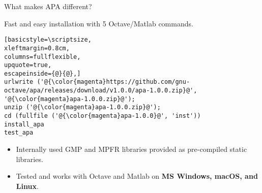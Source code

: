 \begin{frame}[fragile]{What makes APA different?}

\begin{block}{Fast and easy installation with 5 Octave/Matlab commands.}
\begin{lstlisting}[basicstyle=\scriptsize,
xleftmargin=0.8cm,
columns=fullflexible,
upquote=true,
escapeinside={@}{@},]
urlwrite ('@{\color{magenta}https://github.com/gnu-octave/apa/releases/download/v1.0.0/apa-1.0.0.zip}@', '@{\color{magenta}apa-1.0.0.zip}@');
unzip ('@{\color{magenta}apa-1.0.0.zip}@');
cd (fullfile ('@{\color{magenta}apa-1.0.0}@', 'inst'))
install_apa
test_apa
\end{lstlisting}

\begin{itemize}
\item
Internally used GMP and MPFR libraries provided as pre-compiled static libraries.

\item
Tested and works with Octave and Matlab on \textbf{MS Windows, macOS, and Linux}.
\end{itemize}
\end{block}

\end{frame}


